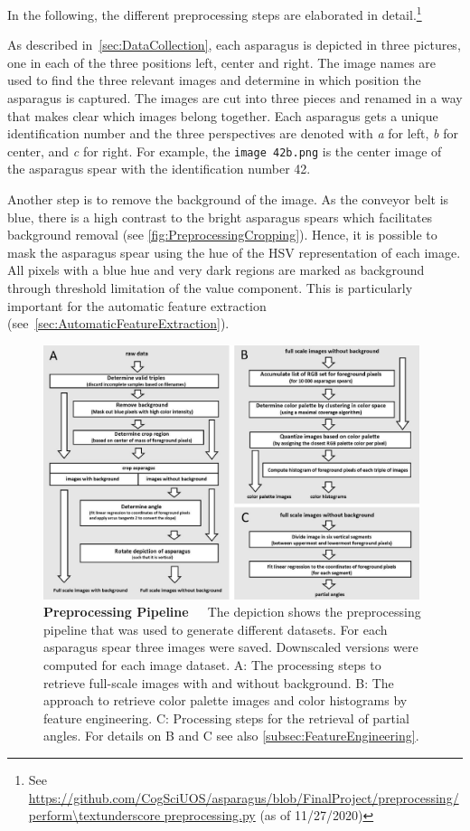 In the following, the different preprocessing steps are elaborated in detail.\footnote{See \url{https://github.com/CogSciUOS/asparagus/blob/FinalProject/preprocessing/perform\textunderscore preprocessing.py} (as of 11/27/2020)}

\bigskip
As described in~\autoref{sec:DataCollection}, each asparagus is depicted in three pictures, one in each of the three positions \textendash{} left, center and right. The image names are used to find the three relevant images and determine in which position the asparagus is captured. The images are cut into three pieces and renamed in a way that makes clear which images belong together. Each asparagus gets a unique identification number and the three perspectives are denoted with \textit{a} for left, \textit{b} for center, and \textit{c} for right. For example, the \texttt{image 42\textunderscore b.png} is the center image of the asparagus spear with the identification number 42.

Another step is to remove the background of the image. As the conveyor belt is blue, there is a high contrast to the bright asparagus spears which facilitates background removal (see \autoref{fig:PreprocessingCropping}). Hence, it is possible to mask the asparagus spear using the hue of the HSV representation of each image. All pixels with a blue hue and very dark regions are marked as background through threshold limitation of the value component. This is particularly important for the automatic feature extraction (see~\autoref{sec:AutomaticFeatureExtraction}).

\begin{figure}[!ht]
	\centering
	\includegraphics[width=0.98\textwidth]{Figures/chapter03/preprocessing_pipeline.png}
	\decoRule
	\caption[Preprocessing Pipeline]{\textbf{Preprocessing Pipeline}~~~The depiction shows the preprocessing pipeline that was used to generate different datasets. For each asparagus spear three images were saved. Downscaled versions were computed for each image dataset. A: The processing steps to retrieve full-scale images with and without background. B: The approach to retrieve color palette images and color histograms by feature engineering. C: Processing steps for the retrieval of partial angles. For details on B and C see also \autoref{subsec:FeatureEngineering}.}
	\label{fig:PreprocessingPipeline}
\end{figure}


